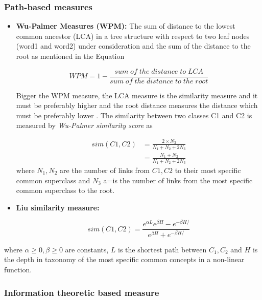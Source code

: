 \documentclass{bmcart}
\begin{document}
\subsubsection{Path-based measures}
\label{sssec:pathBasedMeasure}
\begin{itemize}
\item {\bf Wu-Palmer Measures (WPM):} The sum of distance to the lowest common ancestor (LCA) in a tree structure with respect to two leaf nodes (word1 and word2) under consideration and the sum of the distance to the root as mentioned in the Equation 

\begin{center}
\begin{equation}
WPM=1-\frac{sum\;of\;the\;distance\;to\;LCA}{sum\;of\;the\;distance\;to\;the\;root}
\end{equation}
\label{eqn:wpm}
\end{center}

Bigger the WPM measure, the LCA measure is the similarity measure and it must be preferably higher and the root distance measures the distance which must be preferably lower \cite{wuPalmer}. The similarity between two classes C1 and C2 is measured by {\it Wu-Palmer similarity score} as

\begin{align*}
sim(C1,C2) &= \frac{2 \times N_{3}}{N_{1}+N_{2}+2N_{3}} \\
					&=\frac{N_{1}+N_{2}}{N_{1}+N_{2}+2N_{3}}
\end{align*} where $N_1, N_2$ are the number of links from $C1,C2$ to their most specific common superclass and $N_3$ a=is the number of links from the most specific common superclass to the root. 

\item {\bf Liu similarity measure:} 
\begin{center}
\begin{equation}
sim(C1,C2)=\frac{e^{\alpha L} e^{\beta H} - e^{- \beta H/} }{e^{\beta H} + e^{- \beta H/}}
\end{equation}
\end{center}
\end{itemize}
where $\alpha \geq 0, \beta \geq 0$ are constants, $L$ is the shortest path between $C_1, C_2$ and $H$ is the depth in taxonomy of the most specific common concepts in a non-linear function.

\subsubsection{Information theoretic based measure}
\label{sssec:informationBasedMeasure}
\end{document}
